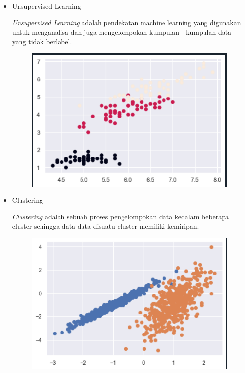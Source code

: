 \begin{enumerate}
\begin{itemize}
\begin{figure}[!htbp]
		\end{figure}
		\newpage
	\item Unsupervised Learning
	\par
		\textit{Unsupervised Learning} adalah pendekatan machine learning yang digunakan untuk menganalisa dan juga mengelompokan kumpulan - kumpulan data yang tidak berlabel.\\
		\begin{figure}[!htbp]
			\centering
			\includegraphics[scale=0.4]{figures/unsupervised-learning.PNG}
		\end{figure}
	\item Clustering
	\par
	\textit{Clustering} adalah sebuah proses pengelompokan data kedalam beberapa cluster sehingga data-data disuatu cluster memiliki kemiripan.\\
	\begin{figure}[!htbp]
		\centering
		\includegraphics[scale=0.4]{figures/clustering.PNG}

\end{figure}
\end{itemize}
\end{enumerate}
